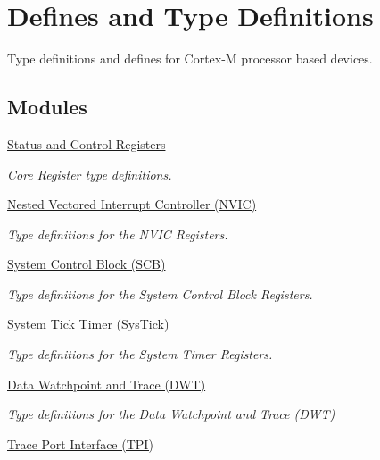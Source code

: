 \hypertarget{group___c_m_s_i_s__core__register}{}\section{Defines and Type Definitions}
\label{group___c_m_s_i_s__core__register}


Type definitions and defines for Cortex-\/M processor based devices.  


\subsection*{Modules}
\begin{DoxyCompactItemize}
\item 
\hyperlink{group___c_m_s_i_s___c_o_r_e}{Status and Control Registers}
\begin{DoxyCompactList}\small\item\em Core Register type definitions. \end{DoxyCompactList}\item 
\hyperlink{group___c_m_s_i_s___n_v_i_c}{Nested Vectored Interrupt Controller (\+N\+V\+I\+C)}
\begin{DoxyCompactList}\small\item\em Type definitions for the N\+V\+IC Registers. \end{DoxyCompactList}\item 
\hyperlink{group___c_m_s_i_s___s_c_b}{System Control Block (\+S\+C\+B)}
\begin{DoxyCompactList}\small\item\em Type definitions for the System Control Block Registers. \end{DoxyCompactList}\item 
\hyperlink{group___c_m_s_i_s___sys_tick}{System Tick Timer (\+Sys\+Tick)}
\begin{DoxyCompactList}\small\item\em Type definitions for the System Timer Registers. \end{DoxyCompactList}\item 
\hyperlink{group___c_m_s_i_s___d_w_t}{Data Watchpoint and Trace (\+D\+W\+T)}
\begin{DoxyCompactList}\small\item\em Type definitions for the Data Watchpoint and Trace (D\+WT) \end{DoxyCompactList}\item 
\hyperlink{group___c_m_s_i_s___t_p_i}{Trace Port Interface (\+T\+P\+I)}

\end{DoxyCompactItemize}
